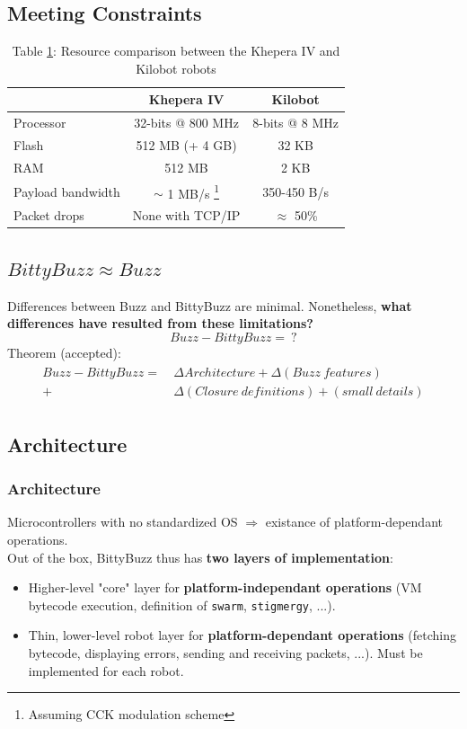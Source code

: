\documentclass{beamer}
\begin{document}
	\begin{frame}
		\section{Meeting Constraints}
		\begin{table}
			\begin{tabular}{l|c|c}
				& Khepera IV        & Kilobot\\
				\hline
				Processor         & 32-bits @ 800 MHz & 8-bits @ 8 MHz\\
				Flash             & 512 MB (+ 4 GB)   & 32 KB\\
				RAM               & 512 MB            & 2 KB\\
				Payload bandwidth & $\sim$ 1 MB/s \footnote{Assuming CCK modulation scheme} \cite{khepera_wifi}  & 350-450 B/s\\
				Packet drops      & None with TCP/IP  & $\approx$ 50\%
			\end{tabular}
			\caption{
				\label{table:khepera kilobot comparison}Table \ref{table:khepera kilobot comparison}: Resource comparison between the Khepera IV and Kilobot robots \cite{khepera_specs}}
		\end{table}
	\end{frame}
	\begin{frame}
		\section{$BittyBuzz \approx Buzz$}
		Differences between Buzz and BittyBuzz are minimal. Nonetheless, \textbf{what differences have resulted from these limitations?}\\
		\[Buzz - BittyBuzz =~?\]
		Theorem (accepted):
		\begin{align}
		\begin{split}
		Buzz - BittyBuzz = ~&\Delta Architecture + \Delta (Buzz~features)\\
		+ &\Delta (Closure~definitions) + (small~details)
		\end{split}
		\end{align}
	\end{frame}
	\begin{frame}
		\subsection{Architecture}
		\frametitle{Architecture}
		Microcontrollers with no standardized OS $\Rightarrow$ existance of platform-dependant operations.\\
		Out of the box, BittyBuzz thus has \textbf{two layers of implementation}:
		\begin{itemize}
			\item Higher-level "core" layer for \textbf{platform-independant operations} (VM bytecode execution, definition of \texttt{swarm}, \texttt{stigmergy}, ...).
			\item Thin, lower-level robot layer for \textbf{platform-dependant operations} (fetching bytecode, displaying errors, sending and receiving packets, ...). Must be implemented for each robot.
		\end{itemize}
	\end{frame}
\end{document}
